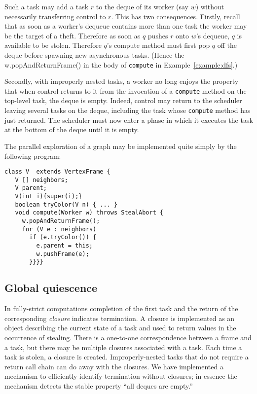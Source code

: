 Such a task may add a task $r$ to the deque of its worker (say
$w$) without necessarily transferring control to $r$. This has two
consequences. Firstly, recall that as soon as a worker's dequeue
contains more than one task the worker may be the target of a
theft. Therefore as soon as $q$ pushes $r$ onto $w$'s dequeue, $q$ is
available to be stolen.  Therefore $q$'s compute method must first pop
$q$ off the deque before spawning new asynchronous tasks. (Hence the {\java
w.popAndReturnFrame()} in the body of {\tt compute} in
Example~\ref{example:dfs}.)

Secondly, with improperly nested tasks, a worker no long enjoys the property
that when control returns to it from the invocation of a {\tt compute}
method on the top-level task, the deque is empty. Indeed, control may
return to the scheduler leaving several tasks on the deque, including
the task whose {\tt compute} method has just returned. The scheduler must
now enter a phase in which it executes the task at the bottom of the
deque until it is empty.

\begin{example} \label{example:dfs-xws}
The parallel exploration of a graph may be implemented quite simply by the following program:
{\footnotesize
\begin{verbatim}
class V  extends VertexFrame {
   V [] neighbors;
   V parent;
   V(int i){super(i);}
   boolean tryColor(V n) { ... }
   void compute(Worker w) throws StealAbort {
     w.popAndReturnFrame();
     for (V e : neighbors) 
       if (e.tryColor()) {
         e.parent = this;
         w.pushFrame(e);
       }}}}
\end{verbatim}}
\end{example}


\subsection{Global quiescence}

In fully-strict computations completion of the first task and the
return of the corresponding {\em closure} indicates termination. A closure is implemented as an object describing the current state of a task and used to return values in the occurrence of stealing. There is a one-to-one correspondence between a frame and a task, but there may be multiple closures associated with a task. Each time a task is stolen, a closure is created. 
Improperly-nested tasks that do not require a return call chain can do
away with the closures. We have implemented a mechanism to efficiently
identify termination without closures; in essence the mechanism detects
the stable property ``all deques are empty.'' 

